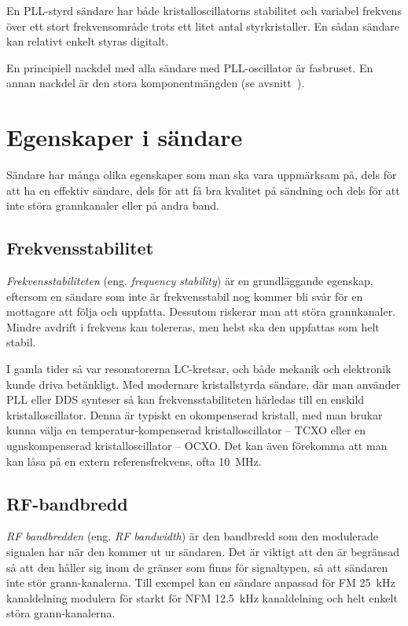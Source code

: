 En PLL-styrd sändare har både kristalloscillatorns stabilitet och variabel
frekvens över ett stort frekvensområde trots ett litet antal styrkristaller.
En sådan sändare kan relativt enkelt styras digitalt.

En principiell nackdel med alla sändare med PLL-oscillator är fasbruset.
En annan nackdel är den stora komponentmängden
(se avsnitt~).

\section{Egenskaper i sändare}

Sändare har många olika egenskaper som man ska vara uppmärksam på, dels för
att ha en effektiv sändare, dels för att få bra kvalitet på sändning och dels
för att inte störa grannkanaler eller på andra band.

\subsection{Frekvensstabilitet}

\emph{Frekvensstabiliteten} (eng. \emph{frequency stability}) är en
grundläggande egenskap, eftersom en sändare som inte är frekvensstabil nog
kommer bli svår för en mottagare att följa och uppfatta.
Dessutom riskerar man att störa grannkanaler.
Mindre avdrift i frekvens kan tolereras, men helst ska den uppfattas som helt
stabil.

I gamla tider så var resonatorerna LC-kretsar, och både mekanik och elektronik
kunde driva betänkligt.
Med modernare kristallstyrda sändare, där man använder PLL eller DDS synteser så
kan frekvensstabiliteten härledas till en enskild kristalloscillator.
Denna är typiskt en okompenserad kristall, med man brukar kunna välja en
temperatur-kompenserad kristalloscillator -- TCXO eller en ugnskompenserad
kristalloscillator -- OCXO.
Det kan även förekomma att man kan låsa på en extern referensfrekvens,
ofta \qty{10}{\mega\hertz}.

\subsection{RF-bandbredd}

\emph{RF bandbredden} (eng. \emph{RF bandwidth}) är den bandbredd som den
modulerade signalen har när den kommer ut ur sändaren.
Det är viktigt att den är begränsad så att den håller sig inom de gränser
som finns för signaltypen, så att sändaren inte stör grann-kanalerna.
Till exempel kan en sändare anpassad för FM \qty{25}{\kilo\hertz} kanaldelning
modulera för starkt för NFM \qty{12,5}{\kilo\hertz} kanaldelning och helt enkelt
störa grann-kanalerna.

